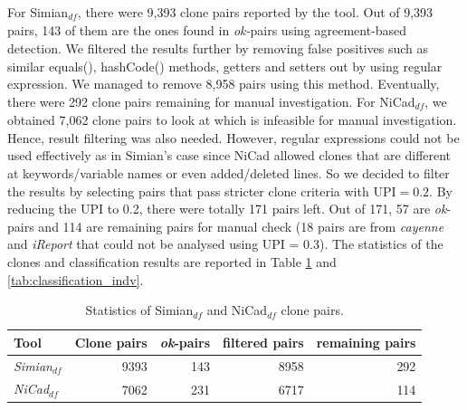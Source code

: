 \documentclass{IEEEtran}
\begin{document}
For Simian$_{\mathrm{\textit{df}}}$, there were 9,393 clone pairs reported by the tool. Out of 9,393 pairs, 143 of them are the ones found in \textit{ok-}pairs using agreement-based detection. We filtered the results further by removing false positives such as similar equals(), hashCode() methods, getters and setters out by using regular expression. We managed to remove 8,958 pairs using this method. Eventually, there were 292 clone pairs remaining for manual investigation. For NiCad$_{\mathrm{\textit{df}}}$, we obtained 7,062 clone pairs to look at which is infeasible for manual investigation. Hence, result filtering was also needed. However, regular expressions could not be used effectively as in Simian's case since NiCad allowed clones that are different at keywords/variable names or even added/deleted lines. So we decided to filter the results by selecting pairs that pass stricter clone criteria with $\mathrm{UPI} = 0.2$. By reducing the UPI to 0.2, there were totally 171 pairs left. Out of 171, 57 are \textit{ok}-pairs and 114 are remaining pairs for manual check (18 pairs are from \textit{cayenne} and \textit{iReport} that could not be analysed using UPI = 0.3). The statistics of the clones and classification results are reported in Table \ref{tab:classification_indv_stats} and \ref{tab:classification_indv}.


\begin{table}[H]
	\centering
	\caption{Statistics of Simian$_{\mathrm{\textit{df}}}$ and NiCad$_{\mathrm{\textit{df}}}$ clone pairs.}
	\label{tab:classification_indv_stats}
	\begin{tabular}{l|r|r|r|r}
		\hline 
		Tool & Clone pairs & \textit{ok}-pairs & filtered pairs & remaining pairs \\ 
		\hline 
		\multirow{1}{*}{\textit{Simian$_{\mathrm{\textit{df}}}$}} & 9393 & 143 & 8958 & 292 \\
		\hline
		\multirow{1}{*}{\textit{NiCad$_{\mathrm{\textit{df}}}$}} & 7062  & 231 & 6717 & 114 \\
		\hline
	\end{tabular} 
\end{table}
\end{document}
